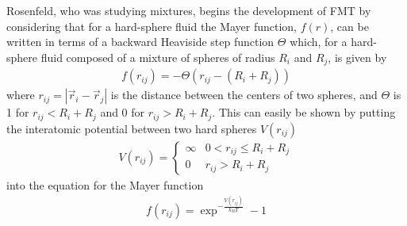 \documentclass[double,12pt]{beavtex}
\begin{document}
Rosenfeld, who was studying mixtures, begins the development of FMT by considering that 
for a hard-sphere fluid the Mayer function, $f(r)$, can be written in terms 
of a backward Heaviside step function $\Theta$ which, for a hard-sphere fluid 
composed of a mixture of spheres of radius $R_i$ and $R_j$, is
given by
\begin{align} 
    f(r_{ij}) = -\Theta(r_{ij}-(R_i + R_j))
\end{align}
where $r_{ij}=|\vec r_i - \vec r_j|$ is the distance between the centers of two spheres, 
and $\Theta$ is 1 for $r_{ij}<R_i+R_j$ and 0 for $r_{ij}>R_i+R_j$.
This can easily be shown by putting the interatomic potential between two hard spheres
$V(r_{ij})$
\begin{align}
    V(r_{ij})=\left\{ \begin{array}{rc} \infty & 0<r_{ij} \leq R_i+R_j \\ 0  & r_{ij}> R_i+R_j \end{array}\right.
\end{align}
into the equation for the Mayer function
\begin{align}
     f(r_{ij})=\exp^{-\frac{V(r_{ij})}{k_{B}T}}-1
\end{align} 
\end{document}
